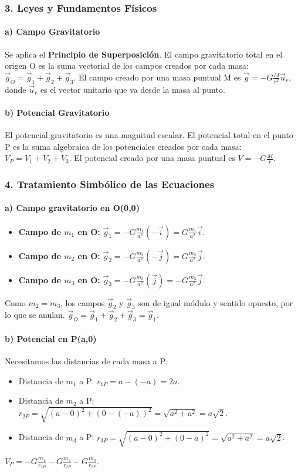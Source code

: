 \subsubsection*{3. Leyes y Fundamentos Físicos}
\paragraph{a) Campo Gravitatorio}
Se aplica el \textbf{Principio de Superposición}. El campo gravitatorio total en el origen O es la suma vectorial de los campos creados por cada masa: $\vec{g}_O = \vec{g}_1 + \vec{g}_2 + \vec{g}_3$. El campo creado por una masa puntual M es $\vec{g} = -G\frac{M}{r^2}\vec{u}_r$, donde $\vec{u}_r$ es el vector unitario que va desde la masa al punto.

\paragraph{b) Potencial Gravitatorio}
El potencial gravitatorio es una magnitud escalar. El potencial total en el punto P es la suma algebraica de los potenciales creados por cada masa: $V_P = V_1 + V_2 + V_3$. El potencial creado por una masa puntual es $V = -G\frac{M}{r}$.

\subsubsection*{4. Tratamiento Simbólico de las Ecuaciones}
\paragraph{a) Campo gravitatorio en O(0,0)}
\begin{itemize}
    \item \textbf{Campo de $m_1$ en O:} $\vec{g}_1 = -G\frac{m_1}{a^2}(-\vec{i}) = G\frac{m_1}{a^2}\vec{i}$.
    \item \textbf{Campo de $m_2$ en O:} $\vec{g}_2 = -G\frac{m_2}{a^2}(-\vec{j}) = G\frac{m_2}{a^2}\vec{j}$.
    \item \textbf{Campo de $m_3$ en O:} $\vec{g}_3 = -G\frac{m_3}{a^2}(\vec{j}) = -G\frac{m_3}{a^2}\vec{j}$.
\end{itemize}
Como $m_2=m_3$, los campos $\vec{g}_2$ y $\vec{g}_3$ son de igual módulo y sentido opuesto, por lo que se anulan.
$\vec{g}_O = \vec{g}_1 + \vec{g}_2 + \vec{g}_3 = \vec{g}_1$.

\paragraph{b) Potencial en P(a,0)}
Necesitamos las distancias de cada masa a P:
\begin{itemize}
    \item Distancia de $m_1$ a P: $r_{1P} = a - (-a) = 2a$.
    \item Distancia de $m_2$ a P: $r_{2P} = \sqrt{(a-0)^2 + (0-(-a))^2} = \sqrt{a^2+a^2} = a\sqrt{2}$.
    \item Distancia de $m_3$ a P: $r_{3P} = \sqrt{(a-0)^2 + (0-a)^2} = \sqrt{a^2+a^2} = a\sqrt{2}$.
\end{itemize}
$V_P = -G\frac{m_1}{r_{1P}} -G\frac{m_2}{r_{2P}} -G\frac{m_3}{r_{3P}}$.


